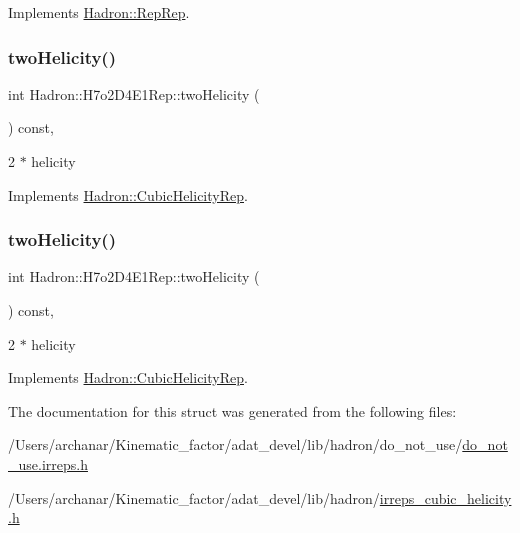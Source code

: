 Implements \mbox{\hyperlink{structHadron_1_1RepRep_ab3213025f6de249f7095892109575fde}{Hadron\+::\+Rep\+Rep}}.

\mbox{\label{structHadron_1_1H7o2D4E1Rep_a66f98547f6f9ab434d2b836bc46deddc}} 
\subsubsection{\texorpdfstring{twoHelicity()}{twoHelicity()}\hspace{0.1cm}{\footnotesize\ttfamily [1/2]}}
{\footnotesize\ttfamily int Hadron\+::\+H7o2\+D4\+E1\+Rep\+::two\+Helicity (\begin{DoxyParamCaption}{ }\end{DoxyParamCaption}) const\hspace{0.3cm}{\ttfamily [inline]}, {\ttfamily [virtual]}}

2 $\ast$ helicity 

Implements \mbox{\hyperlink{structHadron_1_1CubicHelicityRep_af507aa56fc2747eacc8cb6c96db31ecc}{Hadron\+::\+Cubic\+Helicity\+Rep}}.

\mbox{\label{structHadron_1_1H7o2D4E1Rep_a66f98547f6f9ab434d2b836bc46deddc}} 
\subsubsection{\texorpdfstring{twoHelicity()}{twoHelicity()}\hspace{0.1cm}{\footnotesize\ttfamily [2/2]}}
{\footnotesize\ttfamily int Hadron\+::\+H7o2\+D4\+E1\+Rep\+::two\+Helicity (\begin{DoxyParamCaption}{ }\end{DoxyParamCaption}) const\hspace{0.3cm}{\ttfamily [inline]}, {\ttfamily [virtual]}}

2 $\ast$ helicity 

Implements \mbox{\hyperlink{structHadron_1_1CubicHelicityRep_af507aa56fc2747eacc8cb6c96db31ecc}{Hadron\+::\+Cubic\+Helicity\+Rep}}.



The documentation for this struct was generated from the following files\+:\begin{DoxyCompactItemize}
\item 
/\+Users/archanar/\+Kinematic\+\_\+factor/adat\+\_\+devel/lib/hadron/do\+\_\+not\+\_\+use/\mbox{\hyperlink{do__not__use_8irreps_8h}{do\+\_\+not\+\_\+use.\+irreps.\+h}}\item 
/\+Users/archanar/\+Kinematic\+\_\+factor/adat\+\_\+devel/lib/hadron/\mbox{\hyperlink{lib_2hadron_2irreps__cubic__helicity_8h}{irreps\+\_\+cubic\+\_\+helicity.\+h}}\end{DoxyCompactItemize}
